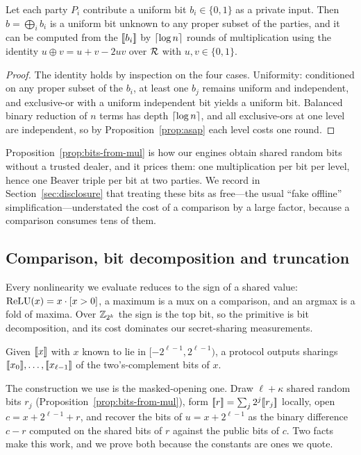 \begin{proposition}
\label{prop:bits-from-mul}
Let each party $P_i$ contribute a uniform bit $b_i \in \{0,1\}$ as a private
input. Then $b = \bigoplus_i b_i$ is a uniform bit unknown to any proper subset
of the parties, and it can be computed from the $[\![b_i]\!]$ by
$\left\lceil \log n \right\rceil$ rounds of multiplication using the identity
$u \oplus v = u + v - 2uv$ over $\mathcal{R}$ with $u,v \in \{0,1\}$.
\end{proposition}

\begin{proof}
The identity holds by inspection on the four cases. Uniformity: conditioned on
any proper subset of the $b_i$, at least one $b_j$ remains uniform and
independent, and exclusive-or with a uniform independent bit yields a uniform
bit. Balanced binary reduction of $n$ terms has depth $\left\lceil \log n \right\rceil$, and all
exclusive-ors at one level are independent, so by Proposition~\ref{prop:asap}
each level costs one round.
\end{proof}

Proposition~\ref{prop:bits-from-mul} is how our engines obtain shared random bits
without a trusted dealer, and it prices them: one multiplication per bit per
level, hence one Beaver triple per bit at two parties. We record in
Section~\ref{sec:disclosure} that treating these bits as free---the usual
``fake offline'' simplification---understated the cost of a comparison by a large
factor, because a comparison consumes tens of them.

\subsection{Comparison, bit decomposition and truncation}
\label{sec:math:bitdec}

Every nonlinearity we evaluate reduces to the sign of a shared value:
$\mathrm{ReLU}(x) = x \cdot [x > 0]$, a maximum is a mux on a comparison, and an argmax
is a fold of maxima. Over $\mathbb{Z}_{2^k}$ the sign is the top bit, so the primitive is
bit decomposition, and its cost dominates our secret-sharing measurements.

\begin{definition}
\label{def:bitdec}
Given $[\![x]\!]$ with $x$ known to lie in $[-2^{\ell-1},2^{\ell-1})$, a
 protocol outputs sharings $[\![x_0]\!],\dots,[\![x_{\ell-1}]\!]$
of the two's-complement bits of $x$.
\end{definition}

The construction we use is the masked-opening one. Draw $\ell + \kappa$ shared
random bits $r_j$ (Proposition~\ref{prop:bits-from-mul}), form
$[\![r]\!] = \sum_j 2^j [\![r_j]\!]$ locally, open
$c = x + 2^{\ell-1} + r$, and recover the bits of $u = x + 2^{\ell-1}$ as the
binary difference $c - r$ computed on the shared bits of $r$ against the public
bits of $c$. Two facts make this work, and we prove both because the constants are
ones we quote.

